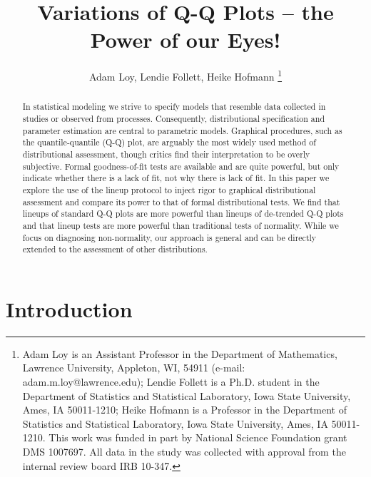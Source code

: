 \documentclass{article}\usepackage[]{graphicx}\usepackage[]{color}
\title{Variations of Q-Q Plots -- the Power of our Eyes!}
\author{Adam Loy, Lendie Follett, Heike Hofmann
\thanks{Adam Loy is an Assistant Professor in the Department of Mathematics, Lawrence University, Appleton, WI, 54911 (e-mail: adam.m.loy@lawrence.edu);  Lendie Follett is a Ph.D. student in the Department of Statistics and Statistical Laboratory, Iowa State University, Ames, IA 50011-1210; Heike Hofmann is a Professor in the Department of Statistics and Statistical Laboratory, Iowa State University, Ames, IA 50011-1210. This work was funded in part by National Science Foundation grant DMS 1007697. All data  in the study was collected  with approval from the internal review board IRB 10-347.}}
\begin{document}
\maketitle
\begin{abstract}
In statistical modeling we strive to specify models that resemble data collected in studies or observed from processes. Consequently, distributional specification and parameter estimation are central to parametric models. Graphical procedures, such as the quantile-quantile (Q-Q) plot, are arguably the most widely used method of distributional assessment, though critics find their interpretation to be overly subjective. Formal goodness-of-fit tests are available and are quite powerful, but only indicate whether there is a lack of fit, not why there is lack of fit. In this paper we explore the use of the lineup protocol to inject rigor to graphical distributional assessment and compare its power to that of formal distributional tests. We find that lineups of standard Q-Q plots are more powerful than lineups of de-trended Q-Q plots and that lineup tests are more powerful than traditional tests of normality. While we focus on diagnosing non-normality, our approach is general and can be directly extended to the assessment of other distributions.
% 
% 
% 
\end{abstract}

\clearpage








\section{Introduction}
\end{document}
